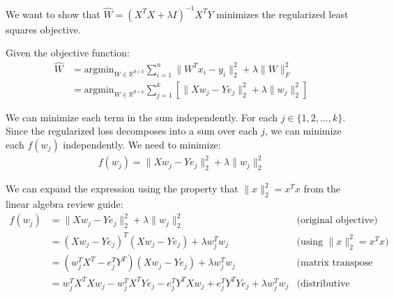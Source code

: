 \documentclass{article}
\begin{document}
\begin{aprob}
\begin{tcolorbox}[colback=lightgray!10!white, colframe=black, title=A5.a, breakable]
        We want to show that $\widehat{W} = (X^T X + \lambda I)^{-1} X^T Y$ minimizes the regularized least squares objective.
        
        Given the objective function:
        \begin{align*}
        \widehat{W} &= \text{argmin}_{W \in \mathbb{R}^{d \times k}} \sum_{i=1}^{n} \| W^Tx_{i} - y_{i} \|^{2}_{2} + \lambda \|W\|_{F}^{2}\\
        &= \text{argmin}_{W \in \mathbb{R}^{d \times k}} \sum_{j=1}^k \left[ \| X w_j - Y e_j\|_2^2 + \lambda \| w_j \|_2^2 \right]
        \end{align*}
        
        We can minimize each term in the sum independently. For each $j \in \{1, 2, \ldots, k\}$. Since the regularized loss decomposes into a sum over each $j$, we can minimize each $f(w_j)$ independently.
        We need to minimize:
        \begin{align*}
        f(w_j) = \| X w_j - Y e_j\|_2^2 + \lambda \| w_j \|_2^2
        \end{align*}
        
        We can expand the expression using the property that $\|x\|_2^2 = x^T x$ from the linear algebra review guide:
        \begin{align*}
        f(w_j) &= \|X w_j - Y e_j\|_2^2 + \lambda \|w_j\|_2^2 & \text{(original objective)} \\
        &= (X w_j - Y e_j)^T (X w_j - Y e_j) + \lambda w_j^T w_j & \text{(using $\|x\|_2^2 = x^T x$)} \\
        &= (w_j^T X^T - e_j^T Y^T)(X w_j - Y e_j) + \lambda w_j^T w_j & \text{(matrix transpose property)} \\
        &= w_j^T X^T X w_j - w_j^T X^T Y e_j - e_j^T Y^T X w_j + e_j^T Y^T Y e_j + \lambda w_j^T w_j & \text{(distributive property)}
        \end{align*}
        

\end{tcolorbox}
\end{aprob}
\end{document}
